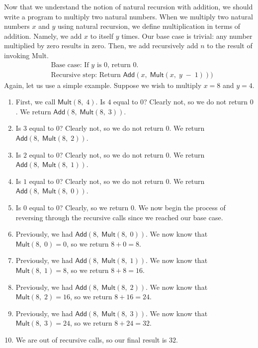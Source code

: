 Now that we understand the notion of natural recursion with addition, we should write a program to multiply two natural numbers. When we multiply two natural numbers $x$ and $y$ using natural recursion, we define multiplication in terms of addition. Namely, we add $x$ to itself $y$ times. Our base case is trivial: any number multiplied by zero results in zero. Then, we add recursively add $n$ to the result of invoking \textsf{Mult}.
\begin{align*}
    &\text{Base case: If }y\text{ is }0\text{, return }0\text{.}\\
    &\text{Recursive step: Return $\textsf{Add}(x,\;\textsf{Mult}(x,\;y\;-\;1)))$}
\end{align*}
Again, let us use a simple example. Suppose we wish to multiply $x=8$ and $y=4$.
\begin{enumerate}[label=(\roman*)]
    \item First, we call $\textsf{Mult}(8,\;4)$. Is $4$ equal to $0$? Clearly not, so we do not return $0$. We return $\textsf{Add}(8,\;\textsf{Mult}(8,\;3))$.
    \item Is $3$ equal to $0$? Clearly not, so we do not return $0$. We return $\textsf{Add}(8,\;\textsf{Mult}(8,\;2))$.
    \item Is $2$ equal to $0$? Clearly not, so we do not return $0$. We return $\textsf{Add}(8,\;\textsf{Mult}(8,\;1))$.
    \item Is $1$ equal to $0$? Clearly not, so we do not return $0$. We return $\textsf{Add}(8,\;\textsf{Mult}(8,\;0))$.
    \item Is $0$ equal to $0$? Clearly, so we return $0$. We now begin the process of reversing through the recursive calls since we reached our base case.
    \item Previously, we had $\textsf{Add}(8,\;\textsf{Mult}(8,\;0))$. We now know that $\textsf{Mult}(8,\;0)=0$, so we return $8+0=8$.
    \item Previously, we had $\textsf{Add}(8,\;\textsf{Mult}(8,\;1))$. We now know that $\textsf{Mult}(8,\;1)=8$, so we return $8+8=16$.
    \item Previously, we had $\textsf{Add}(8,\;\textsf{Mult}(8,\;2))$. We now know that $\textsf{Mult}(8,\;2)=16$, so we return $8+16=24$.
    \item Previously, we had $\textsf{Add}(8,\;\textsf{Mult}(8,\;3))$. We now know that $\textsf{Mult}(8,\;3)=24$, so we return $8+24=32$.
    \item We are out of recursive calls, so our final result is $32$.
\end{enumerate}


